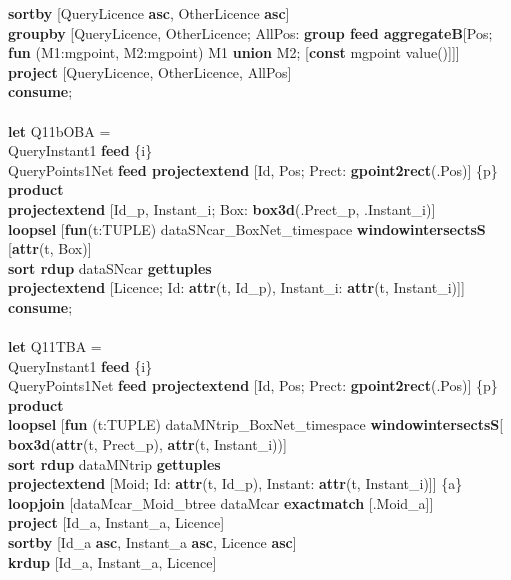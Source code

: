 \documentclass[a4paper]{article}
\newcommand{\op}[1]{\textbf{#1}}
\begin{document}
\begin{scriptsize}
\begin{tabbing}
\>\op{sortby} [QueryLicence \op{asc}, OtherLicence \op{asc}]\\
\>\op{groupby} [QueryLicence, OtherLicence; AllPos: \op{group feed aggregateB}[Pos;\\
\>\>\>\op{fun} (M1:mgpoint, M2:mgpoint) M1 \op{union} M2; [\op{const} mgpoint value()]]]\\
\>\op{project} [QueryLicence, OtherLicence, AllPos]\\
\op{consume};\\
\\
\op{let} Q11bOBA =\\
\>QueryInstant1 \op{feed} \{i\}\\
\>QueryPoints1Net \op{feed projectextend} [Id, Pos; Prect: \op{gpoint2rect}(.Pos)] \{p\}\\
\>\op{product}\\
\>\op{projectextend} [Id\_p, Instant\_i; Box: \op{box3d}(.Prect\_p, .Instant\_i)]\\
\>\op{loopsel} [\op{fun}(t:TUPLE) dataSNcar\_BoxNet\_timespace \op{windowintersectsS} [\op{attr}(t, Box)]\\
\>\>\op{sort rdup} dataSNcar \op{gettuples}\\
\>\>\op{projectextend} [Licence; Id: \op{attr}(t, Id\_p), Instant\_i: \op{attr}(t, Instant\_i)]]\\
\op{consume};\\
\\
\op{let} Q11TBA =\\
\>QueryInstant1 \op{feed} \{i\}\\
\>QueryPoints1Net \op{feed projectextend} [Id, Pos; Prect: \op{gpoint2rect}(.Pos)] \{p\}\\
\>\op{product}\\
\>\op{loopsel} [\op{fun} (t:TUPLE) dataMNtrip\_BoxNet\_timespace \op{windowintersectsS}[\\ 
\>\>\>\op{box3d}(\op{attr}(t, Prect\_p), \op{attr}(t, Instant\_i))]\\
\>\>\op{sort rdup} dataMNtrip \op{gettuples}\\
\>\>\op{projectextend} [Moid; Id: \op{attr}(t, Id\_p), Instant: \op{attr}(t, Instant\_i)]] \{a\}\\
\>\op{loopjoin} [dataMcar\_Moid\_btree dataMcar \op{exactmatch} [.Moid\_a]]\\
\>\op{project} [Id\_a, Instant\_a, Licence]\\
\>\op{sortby} [Id\_a \op{asc}, Instant\_a \op{asc}, Licence \op{asc}]\\
\>\op{krdup} [Id\_a, Instant\_a, Licence]\\

\end{tabbing}
\end{scriptsize}
\end{document}
